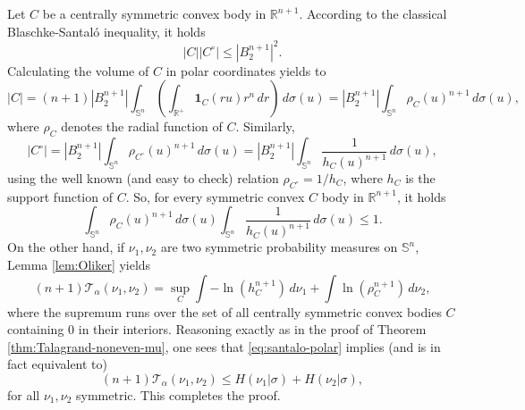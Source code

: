 \documentclass[10pt]{amsart}
\theoremstyle{definition}
\theoremstyle{remark}
\newcommand{\R}{\mathbb{R}}
\begin{document}
Let $C$ be a centrally symmetric convex body in $\R^{n+1}$.  According to the classical Blaschke-Santal\'o inequality, it holds 
\[
|C||C^\circ| \leq |B_2^{n+1}|^2.
\]
Calculating the volume of $C$ in polar coordinates yields to
\[
|C| = (n+1)|B_2^{n+1}| \int_{\mathbb{S}^n}\left(\int_{\R^+} \mathbf{1}_C(ru) r^n \,dr\right)\,d\sigma(u) = |B_2^{n+1}| \int_{\mathbb{S}^n}\rho_C(u)^{n+1}\,d\sigma(u),
\]
where $\rho_C$ denotes the radial function of $C$.
Similarly, 
\[
|C^\circ| =  |B_2^{n+1}| \int_{\mathbb{S}^n}\rho_{C^\circ}(u)^{n+1}\,d\sigma(u) =  |B_2^{n+1}| \int_{\mathbb{S}^n}\frac{1}{h_{C}(u)^{n+1}} \,d\sigma(u),
\] 
using the well known (and easy to check) relation $\rho_{C^\circ} = 1/h_C$, where $h_C$ is the support function of $C$.
So, for every symmetric convex $C$ body in $\R^{n+1}$, it holds
\begin{equation}\label{eq:santalo-polar}
\int_{\mathbb{S}^n}\rho_C(u)^{n+1} \,d\sigma(u)\int_{\mathbb{S}^n}\frac{1}{h_{C}(u)^{n+1}} \,d\sigma(u) \leq 1.
\end{equation}
On the other hand, if $\nu_1,\nu_2$ are two symmetric probability measures on $\mathbb{S}^n$, Lemma \ref{lem:Oliker} yields 
\[
(n+1)\mathcal{T}_\alpha(\nu_1,\nu_2) = \sup_{C} \int -\ln \left(h_C^{n+1}\right)\,d\nu_1+\int \ln \left(\rho_C^{n+1}\right)\,d\nu_2,
\]
where the supremum runs over the set of all centrally symmetric convex bodies $C$ containing $0$ in their interiors. 
Reasoning exactly as in the proof of Theorem \ref{thm:Talagrand-noneven-mu}, one sees that \eqref{eq:santalo-polar} implies (and is in fact equivalent to)
\[
(n+1)\mathcal{T}_\alpha(\nu_1,\nu_2) \leq H(\nu_1|\sigma) + H(\nu_2|\sigma),
\]
for all $\nu_1,\nu_2$ symmetric. This completes the proof.
\endproof
\end{document}
